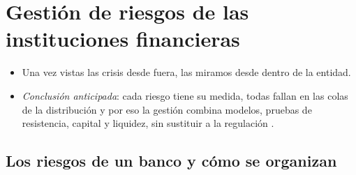 \documentclass[11pt]{article}
\begin{document}
\section{Gestión de riesgos de las instituciones financieras}\label{sec:riesgos}

\begin{itemize}
\item Una vez vistas las crisis desde fuera, las miramos desde dentro de la entidad.
\item \emph{Conclusión anticipada}: cada riesgo tiene su medida, todas fallan en las colas de la distribución y por eso la gestión combina modelos, pruebas de resistencia, capital y liquidez, sin sustituir a la regulación .
\end{itemize}

\subsection{Los riesgos de un banco y cómo se organizan}\label{sec:riesgos-mapa}
\end{document}
